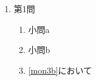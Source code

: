 \begin{enumerate}
	\item 第1問
	\begin{enumerate}
		\item 小問a
		\item\label{mon3b}小問b
		\item \ref{mon3b}において
	\end{enumerate}
\end{enumerate}
